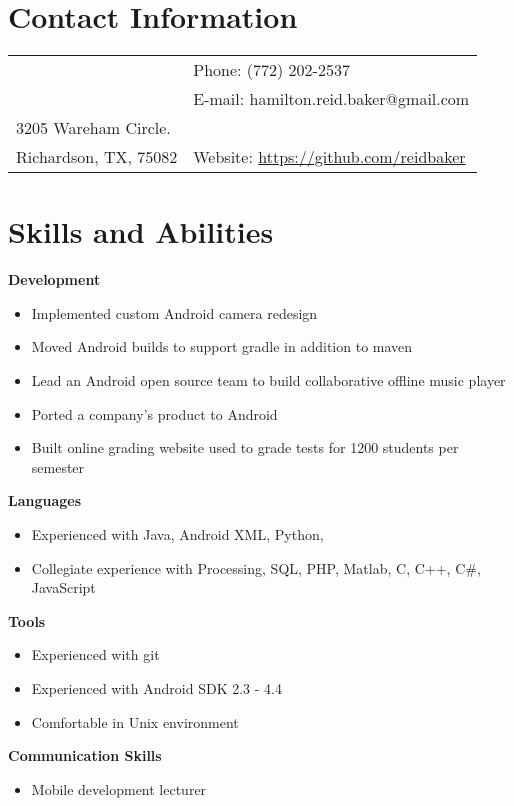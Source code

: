 \documentclass[margin,line]{res}
\begin{document}
 \hfill

\begin{resume}
\section{\sc Contact Information}
\vspace{.05in}
\begin{tabular}{@{}p{3.5in}p{3in}} & {Phone:}  (772) 202-2537 \\
& {E-mail:}  hamilton.reid.baker@gmail.com\\
3205 Wareham Circle. \\
Richardson, TX, 75082  & {Website:} \url{https://github.com/reidbaker}
\end{tabular}
 
\section{\sc Skills and Abilities}
 {\bf Development}
    \begin{itemize}
    \item Implemented custom Android camera redesign
    \item Moved Android builds to support gradle in addition to maven
    \item Lead an Android open source team to build collaborative offline music player
    \item Ported a company's product to Android
    \item Built online grading website used to grade tests for 1200 students per semester
    \end{itemize}
 {\bf Languages}
    \begin{itemize}
    \item Experienced with Java, Android XML, Python, 
    \item Collegiate experience with Processing, SQL, PHP, Matlab,  C, C++, C\#, JavaScript
    \end{itemize}
 {\bf Tools}
    \begin{itemize}
    \item Experienced with git
    \item Experienced with Android SDK 2.3 - 4.4
    \item Comfortable in Unix environment
    \end{itemize}
 {\bf Communication Skills}
    \begin{itemize}
    \item Mobile development lecturer

\end{itemize}
\end{resume}
\end{document}

